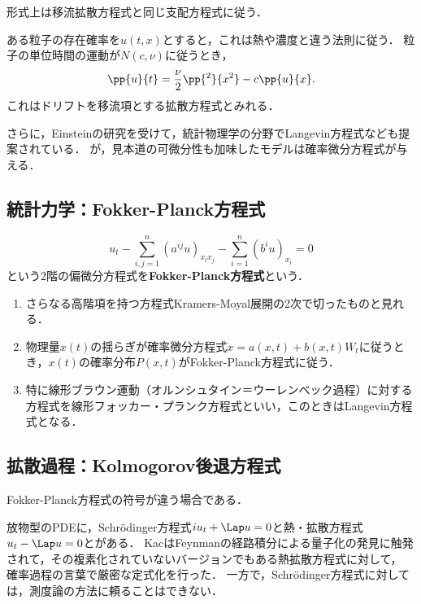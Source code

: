 \documentclass[uplatex,dvipdfmx]{jsreport}
\begin{document}
\begin{tcolorbox}[colframe=ForestGreen, colback=ForestGreen!10!white,breakable,colbacktitle=ForestGreen!40!white,coltitle=black,fonttitle=\bfseries\sffamily,
title=]
    形式上は移流拡散方程式と同じ支配方程式に従う．
\end{tcolorbox}

\begin{model}
    ある粒子の存在確率を$u(t,x)$とすると，これは熱や濃度と違う法則に従う．
    粒子の単位時間の運動が$N(c,\nu)$に従うとき，
    \[\pp{u}{t}=\frac{\nu}{2}\pp{^2}{x^2}-c\pp{u}{x}.\]
    これはドリフトを移流項とする拡散方程式とみれる．
\end{model}
\begin{history}
    さらに，Einsteinの研究を受けて，統計物理学の分野でLangevin方程式なども提案されている．
    が，見本道の可微分性も加味したモデルは確率微分方程式が与える．
\end{history}

\subsection{統計力学：Fokker-Planck方程式}

\begin{model}
    \[u_t-\sum_{i,j=1}^n(a^{ij}u)_{x_ix_j}-\sum_{i=1}^n(b^iu)_{x_i}=0\]
    という2階の偏微分方程式を\textbf{Fokker-Planck方程式}という．
    \begin{enumerate}
        \item さらなる高階項を持つ方程式Kramers-Moyal展開の2次で切ったものと見れる．
        \item 物理量$x(t)$の揺らぎが確率微分方程式$\dot{x}=a(x,t)+b(x,t)W_t$に従うとき，$x(t)$の確率分布$P(x,t)$がFokker-Planck方程式に従う．
        \item 特に線形ブラウン運動（オルンシュタイン＝ウーレンベック過程）に対する方程式を線形フォッカー・プランク方程式といい，このときはLangevin方程式となる．
    \end{enumerate}
\end{model}

\subsection{拡散過程：Kolmogorov後退方程式}

\begin{tcolorbox}[colframe=ForestGreen, colback=ForestGreen!10!white,breakable,colbacktitle=ForestGreen!40!white,coltitle=black,fonttitle=\bfseries\sffamily,
    title=]
    Fokker-Planck方程式の符号が違う場合である．

    放物型のPDEに，Schrödinger方程式$iu_t+\Lap u=0$と熱・拡散方程式$u_t-\Lap u=0$とがある．
    KacはFeynmanの経路積分による量子化の発見に触発されて，その複素化されていないバージョンでもある熱拡散方程式に対して，
    確率過程の言葉で厳密な定式化を行った．
    一方で，Schrödinger方程式に対しては，測度論の方法に頼ることはできない．
\end{tcolorbox}
\end{document}
